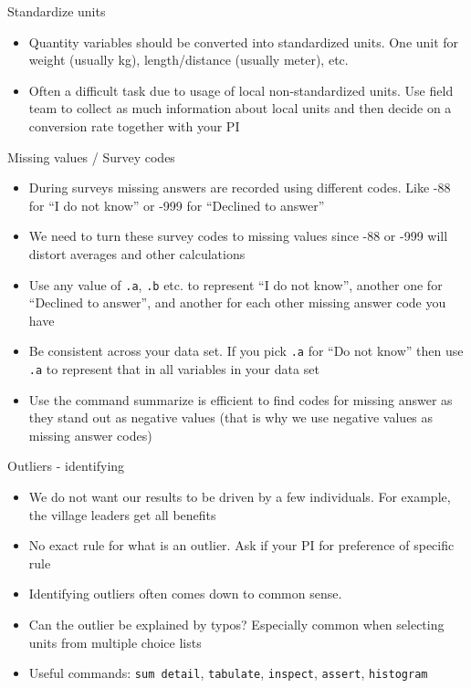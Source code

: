 \documentclass[aspectratio=169]{beamer}
\begin{document}
\begin{frame}{Standardize units }
	\begin{itemize}
		\item Quantity variables should be converted into standardized units. One unit for weight (usually kg), length/distance (usually meter), etc. 
		\item Often a difficult task due to usage of local non-standardized units. Use field team to collect as much information about local units and then decide on a conversion rate together with your PI	
	\end{itemize}
\end{frame}


\begin{frame}{Missing values / Survey codes}
	\begin{itemize}
		\item During surveys missing answers are recorded using different codes. Like -88 for “I do not know” or -999 for “Declined to answer”
		\item We need to turn these survey codes to missing values since -88 or -999 will distort averages and other calculations
		\item Use any value of \texttt{.a}, \texttt{.b} etc. to represent “I do not know”, another one for “Declined to answer”, and another for each other missing answer code you have
		\item Be consistent across your data set. If you pick \texttt{.a} for “Do not know” then use \texttt{.a} to represent that in all variables in your data set
		\item Use the command summarize is efficient to find codes for missing answer as they stand out as negative values (that is why we use negative values as missing answer codes)
	\end{itemize}
\end{frame}



\begin{frame}{Outliers - identifying}
\begin{itemize}
	\item We do not want our results to be driven by a few individuals. For example, the village leaders get all benefits
	\item No exact rule for what is an outlier.  Ask if your PI for preference of specific rule
	\item Identifying outliers often comes down to common sense.
	\item Can the outlier be explained by typos? Especially common when selecting units from multiple choice lists
	\item Useful commands: \texttt{sum detail}, \texttt{tabulate}, \texttt{inspect}, \texttt{assert}, \texttt{histogram}
	
\end{itemize}
\end{frame}
\end{document}
